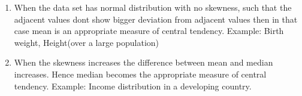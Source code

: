 \renewcommand{\theequation}{\theenumi}
\begin{enumerate}[label=\thesection.\arabic*.,ref=\thesection.\theenumi]

\item When the data set has normal distribution with no skewness, such that the adjacent values dont show bigger deviation from adjacent values then in that case mean is an appropriate measure of central tendency.
Example: Birth weight, Height(over a large population)
\item When the skewness increases the difference between mean and median increases. Hence median becomes the appropriate measure of central tendency. 
Example: Income distribution in a developing country.

\end{enumerate}